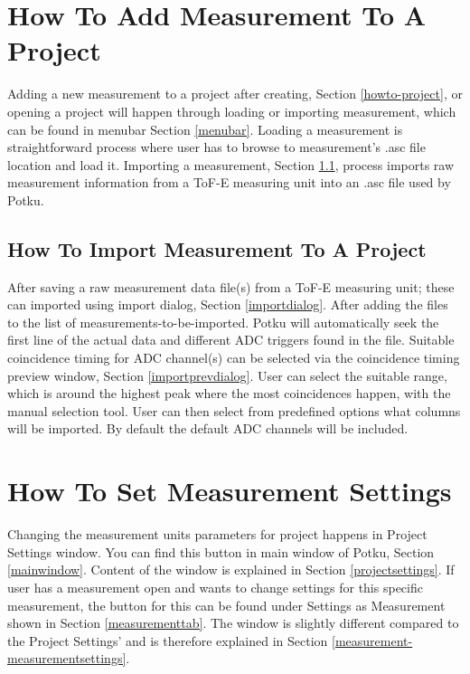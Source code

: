 \documentclass{scrreprt}
\begin{document}
\section{How To Add Measurement To A Project}\label{howto-measurement}
Adding a new measurement to a project after creating, Section \ref{howto-project}, or opening a project will happen through loading or importing measurement, which can be found in menubar Section \ref{menubar}.
Loading a measurement is straightforward process where user has to browse to measurement's .asc file location and load it.
Importing a measurement, Section \ref{howto-measurement-import}, process imports raw measurement information from a ToF-E measuring unit into an .asc file used by Potku.

\subsection{How To Import Measurement To A Project}\label{howto-measurement-import}
After saving a raw measurement data file(s) from a ToF-E measuring unit; these can imported using import dialog, Section \ref{importdialog}.
After adding the files to the list of measurements-to-be-imported. Potku will automatically seek the first line of the actual data and different ADC triggers found in the file.
Suitable coincidence timing for ADC channel(s) can be selected via the coincidence timing preview window, Section \ref{importprevdialog}.
User can select the suitable range, which is around the highest peak where the most coincidences happen, with the manual selection tool.
User can then select from predefined options what columns will be imported. By default the default ADC channels will be included.

\section{How To Set Measurement Settings}\label{howto-settings}
Changing the measurement units parameters for project happens in Project Settings window. You can find this button in main window of Potku, Section \ref{mainwindow}.
Content of the window is explained in Section \ref{projectsettings}.
If user has a measurement open and wants to change settings for this specific measurement, the button for this can be found under Settings as Measurement shown in Section \ref{measurementtab}.
The window is slightly different compared to the Project Settings' and is therefore explained in Section \ref{measurement-measurementsettings}.
\end{document}
